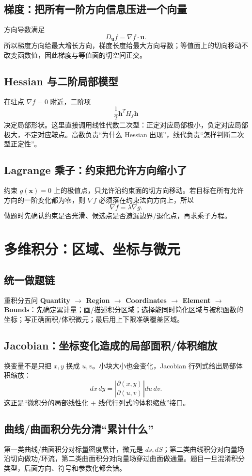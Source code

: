 \documentclass[11pt,a4paper,openany]{ctexbook}
\begin{document}
\section{梯度：把所有一阶方向信息压进一个向量}
方向导数满足
\[
D_{\bm u}f=\nabla f\cdot\bm u.
\]
所以梯度方向给最大增长方向，梯度长度给最大方向导数；等值面上的切向移动不改变函数值，因此梯度与等值面的切空间正交。

\section{Hessian 与二阶局部模型}
在驻点 $\nabla f=0$ 附近，二阶项
\[
\frac12\bm h^T H_f\bm h
\]
决定局部形状。这里直接调用线性代数二次型：正定对应局部极小，负定对应局部极大，不定对应鞍点。高数负责“为什么 Hessian 出现”，线代负责“怎样判断二次型正定性”。

\section{Lagrange 乘子：约束把允许方向缩小了}
约束 $g(\bm x)=0$ 上的极值点，只允许沿约束面的切方向移动。若目标在所有允许方向的一阶变化都为零，则 $\nabla f$ 必须落在约束法向方向上，所以
\[
\nabla f=\lambda\nabla g.
\]
做题时先确认约束是否光滑、候选点是否遗漏边界/退化点，再求乘子方程。

\chapter{多维积分：区域、坐标与微元}
\section{统一做题链}
\begin{corebox}{重积分五问}
\textbf{Quantity $\to$ Region $\to$ Coordinates $\to$ Element $\to$ Bounds}：先确定累计量；画/描述积分区域；选择能同时简化区域与被积函数的坐标；写正确面积/体积微元；最后用上下限准确覆盖区域。
\end{corebox}

\section{Jacobian：坐标变化造成的局部面积/体积缩放}
换变量不是只把 $x,y$ 换成 $u,v$。小块大小也会变化，Jacobian 行列式给出局部体积缩放：
\[
dx\,dy=\left|\frac{\partial(x,y)}{\partial(u,v)}\right|du\,dv.
\]
这正是“微积分的局部线性化 + 线代行列式的体积缩放”接口。

\section{曲线/曲面积分先分清“累计什么”}
第一类曲线/曲面积分对标量密度累计，微元是 $ds,dS$；第二类曲线积分对向量场沿切向做功/环流，第二类曲面积分对向量场穿过曲面做通量。题目一旦混淆积分类型，后面方向、符号和参数化都会错。
\end{document}
